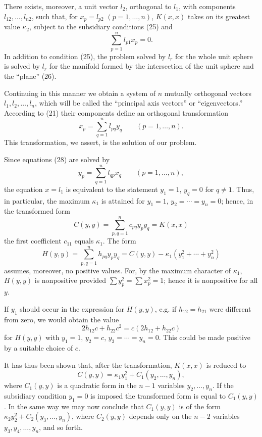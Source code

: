 There exists, moreover, a unit vector $l_2$, orthogonal to $l_1$, with components $l_{12},\ldots,l_{n2}$, such that, for $x_p=l_{p2}$ $(p=1,\ldots,n)$, $K(x,x)$ takes on its greatest value $\kappa_2$, subject to the subsidiary conditions (25) and
\begin{equation}\sum_{p=1}^n l_{p1}x_p=0. \tag{26}\end{equation}
In addition to condition (25), the problem solved by $l_r$ for the whole unit sphere is solved by $l_r$ for the manifold formed by the intersection of the unit sphere and the ``plane'' (26).

Continuing in this manner we obtain a system of $n$ mutually orthogonal vectors $l_1,l_2,\ldots,l_n$, which will be called the ``principal axis vectors'' or ``eigenvectors.'' According to (21) their components define an orthogonal transformation
\begin{equation}x_p=\sum_{q=1}^n l_{pq}y_q \qquad (p=1,\ldots,n). \tag{28}\end{equation}
This transformation, we assert, is the solution of our problem.

Since equations (28) are solved by
\begin{equation}y_p=\sum_{q=1}^n l_{qp}x_q \qquad (p=1,\ldots,n), \tag{29}\end{equation}
the equation $x=l_1$ is equivalent to the statement $y_1=1$, $y_q=0$ for $q\ne1$. Thus, in particular, the maximum $\kappa_1$ is attained for $y_1=1$, $y_2=\cdots=y_n=0$; hence, in the transformed form
\[C(y,y)=\sum_{p,q=1}^n c_{pq}y_py_q=K(x,x)\]
the first coefficient $c_{11}$ equals $\kappa_1$. The form
\[H(y,y)=\sum_{p,q=1}^n h_{pq}y_py_q=C(y,y)-\kappa_1(y_1^2+\cdots+y_n^2)\]
assumes, moreover, no positive values. For, by the maximum character of $\kappa_1$, $H(y,y)$ is nonpositive provided $\sum y_p^2=\sum x_p^2=1$; hence it is nonpositive for all $y$.

If $y_1$ should occur in the expression for $H(y,y)$, e.g. if $h_{12}=h_{21}$ were different from zero, we would obtain the value
\[2h_{12}c+h_{22}c^2=c(2h_{12}+h_{22}c)\]
for $H(y,y)$ with $y_1=1$, $y_2=c$, $y_3=\cdots=y_n=0$. This could be made positive by a suitable choice of $c$.

It has thus been shown that, after the transformation, $K(x,x)$ is reduced to
\[C(y,y)=\kappa_1y_1^2+C_1(y_2,\ldots,y_n),\]
where $C_1(y,y)$ is a quadratic form in the $n-1$ variables $y_2,\ldots,y_n$. If the subsidiary condition $y_1=0$ is imposed the transformed form is equal to $C_1(y,y)$. In the same way we may now conclude that $C_1(y,y)$ is of the form $\kappa_2y_2^2+C_2(y_3,\ldots,y_n)$, where $C_2(y,y)$ depends only on the $n-2$ variables $y_3,y_4,\ldots,y_n$, and so forth.

